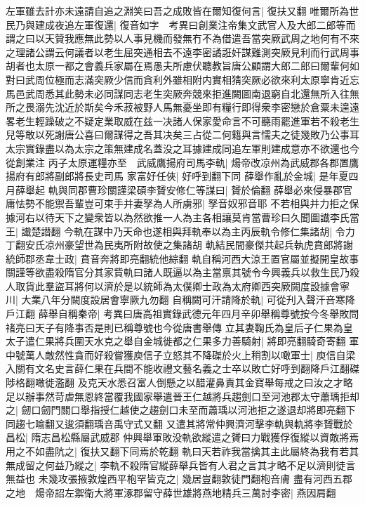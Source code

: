左軍雖去計亦未遠請自追之淵笑曰吾之成敗皆在爾知復何言|{
	復扶又翻}
唯爾所為世民乃與建成夜追左軍復還|{
	復音如字　考異曰創業注帝集文武官人及大郎二郎等而謂之曰以天贊我應無此勢以人事見機而發無冇不為借遣吾當突厥武周之地何有不來之理諸公謂云何議者以老生屈突通相去不遠李密譎誑奸謀難測突厥見利而行武周事胡者也太原一都之會義兵家屬在焉愚夫所慮伏聽教旨唐公顧謂大郎二郎曰爾輩何如對曰武周位極而志滿突厥少信而貪利外雖相附内實相猜突厥必欲來利太原寧肯近忘馬邑武周悉其此勢未必同謀同志老生突厥奔競來拒進闕圖南退窮自北還無所入往無所之畏溺先沈近於斯矣今禾菽被野人馬無憂坐即有糧行即得衆李密戀於倉粟未遑遠畧老生輕躁破之不疑定業取威在兹一决諸人保家愛命言不可聽雨罷進軍若不殺老生兒等敢以死謝唐公喜曰爾謀得之吾其决矣三占從二何籍與言懦夫之徒幾敗乃公事耳太宗實錄盡以為太宗之策無建成名蓋没之耳據建成同追左軍則建成意亦不欲還也今從創業注}
丙子太原運糧亦至　武威鷹揚府司馬李軌|{
	煬帝改凉州為武威郡各郡置鷹揚府有郎將副郎將長史司馬}
家富好任俠|{
	好呼到翻下同}
薛舉作亂於金城|{
	是年夏四月薛舉起}
軌與同郡曹珍關謹梁碩李贇安修仁等謀曰|{
	贇於倫翻}
薛舉必來侵暴郡官庸怯勢不能禦吾輩豈可束手并妻孥為人所虜邪|{
	孥音奴邪音耶}
不若相與并力拒之保據河右以待天下之變衆皆以為然欲推一人為主各相讓莫肯當曹珍曰久聞圖䜟李氏當王|{
	䜟楚譛翻}
今軌在謀中乃天命也遂相與拜軌奉以為主丙辰軌令修仁集諸胡|{
	令力丁翻安氏凉州豪望世為民夷所附故使之集諸胡}
軌結民間豪傑共起兵執虎賁郎將謝統師郡丞韋士政|{
	賁音奔將即亮翻統他綜翻}
軌自稱河西大涼王置官屬並擬開皇故事關謹等欲盡殺隋官分其家貲軌曰諸人既逼以為主當禀其號令今興義兵以救生民乃殺人取貨此羣盜耳將何以濟於是以統師為太僕卿士政為太府卿西突厥闕度設據會寧川|{
	大業八年分闕度設居會寧厥九勿翻}
自稱闕可汗請降於軌|{
	可從刋入聲汗咅寒降戶江翻}
薛舉自稱秦帝|{
	考異曰唐高祖實錄武德元年四月辛卯舉稱尊號按今冬舉敗問禇亮曰天子有降事否是則已稱尊號也今從唐書舉傳}
立其妻鞠氏為皇后子仁果為皇太子遣仁果將兵圍天水克之舉自金城徙都之仁果多力善騎射|{
	將即亮翻騎奇寄翻}
軍中號萬人敵然性貪而好殺嘗獲庾信子立怒其不降磔於火上稍割以噉軍士|{
	庾信自梁入關有文名史言薛仁果在兵間不能收禮文藝名義之士卒以敗亡好呼到翻降戶江翻磔陟格翻噉徙濫翻}
及克天水悉召富人倒懸之以醋灌鼻責其金寶舉每戒之曰汝之才略足以辦事然苛虐無恩終當覆我國家舉遣晉王仁越將兵趨劍口至河池郡太守蕭瑀拒却之|{
	劒口劒門關口舉指授仁越使之趨劍口未至而蕭瑀以河池拒之遂退却將即亮翻下同趨七喻翻又逡須翻瑀咅禹守式又翻}
又遣其將常仲興濟河擊李軌與軌將李贇戰於昌松|{
	隋志昌松縣屬武威郡}
仲興舉軍敗没軌欲縱遣之贇曰力戰獲俘復縱以資敵將焉用之不如盡阬之|{
	復扶又翻下同焉於乾翻}
軌曰天若祚我當擒其主此屬終為我有若其無成留之何益乃縱之|{
	李軌不殺隋官縱薛舉兵皆有人君之言其才略不足以濟則徒言無益也}
未幾攻張掖敦煌西平枹罕皆克之|{
	幾居豈翻敦徒門翻枹咅膚}
盡有河西五郡之地　煬帝詔左禦衛大將軍涿郡留守薛世雄將燕地精兵三萬討李密|{
	燕因肩翻}
